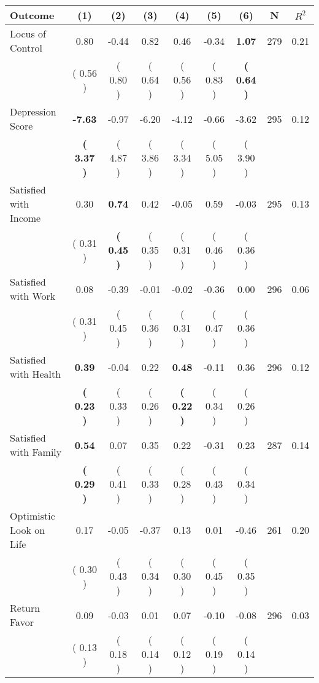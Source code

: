 \begin{tabular}{lcccccccc}
\toprule
 \textbf{Outcome} & \textbf{(1)} & \textbf{(2)} & \textbf{(3)} & \textbf{(4)} & \textbf{(5)} & \textbf{(6)} & \textbf{N} & \textbf{$ R^2$} \\
\midrule
Locus of Control &      0.80 &     -0.44 &      0.82 &      0.46 &     -0.34 & \textbf{     1.07} & 279 &       0.21 \\ 
 & (     0.56 ) & (     0.80 ) & (     0.64 ) & (     0.56 ) & (     0.83 ) & \textbf{(     0.64 )} & \\
Depression Score & \textbf{    -7.63} &     -0.97 &     -6.20 &     -4.12 &     -0.66 &     -3.62 & 295 &       0.12 \\ 
 & \textbf{(     3.37 )} & (     4.87 ) & (     3.86 ) & (     3.34 ) & (     5.05 ) & (     3.90 ) & \\
Satisfied with Income &      0.30 & \textbf{     0.74} &      0.42 &     -0.05 &      0.59 &     -0.03 & 295 &       0.13 \\ 
 & (     0.31 ) & \textbf{(     0.45 )} & (     0.35 ) & (     0.31 ) & (     0.46 ) & (     0.36 ) & \\
Satisfied with Work &      0.08 &     -0.39 &     -0.01 &     -0.02 &     -0.36 &      0.00 & 296 &       0.06 \\ 
 & (     0.31 ) & (     0.45 ) & (     0.36 ) & (     0.31 ) & (     0.47 ) & (     0.36 ) & \\
Satisfied with Health & \textbf{     0.39} &     -0.04 &      0.22 & \textbf{     0.48} &     -0.11 &      0.36 & 296 &       0.12 \\ 
 & \textbf{(     0.23 )} & (     0.33 ) & (     0.26 ) & \textbf{(     0.22 )} & (     0.34 ) & (     0.26 ) & \\
Satisfied with Family & \textbf{     0.54} &      0.07 &      0.35 &      0.22 &     -0.31 &      0.23 & 287 &       0.14 \\ 
 & \textbf{(     0.29 )} & (     0.41 ) & (     0.33 ) & (     0.28 ) & (     0.43 ) & (     0.34 ) & \\
Optimistic Look on Life &      0.17 &     -0.05 &     -0.37 &      0.13 &      0.01 &     -0.46 & 261 &       0.20 \\ 
 & (     0.30 ) & (     0.43 ) & (     0.34 ) & (     0.30 ) & (     0.45 ) & (     0.35 ) & \\
Return Favor &      0.09 &     -0.03 &      0.01 &      0.07 &     -0.10 &     -0.08 & 296 &       0.03 \\ 
 & (     0.13 ) & (     0.18 ) & (     0.14 ) & (     0.12 ) & (     0.19 ) & (     0.14 ) & \\

\end{tabular}
